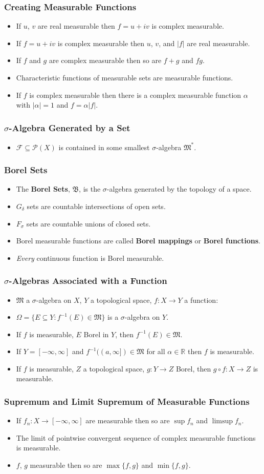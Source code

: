 \documentclass{article}
\newcounter{topicnumber}[section]
\newcommand{\steptopic}[1][1]{\addtocounter{topicnumber}{#1}}
\newenvironment{topic}[1]{%
\steptopic%
\subsubsection{#1}%
\begin{itemize}%
}{%
\end{itemize}%
}
\newcommand{\term}[1]{{\bf #1}}
\newcommand{\setup}{\item[\null]}
\newcommand{\remark}{\item}
\newcommand{\powerset}{\mathscr{P}}
\begin{document}
\begin{topic}{Creating Measurable Functions}
\remark If $u$, $v$ are real measurable then $f = u + iv$ is complex measurable.
\remark If $f = u + iv$ is complex measurable then $u$, $v$, and $|f|$ are real measurable.
\remark If $f$ and $g$ are complex measurable then so are $f + g$ and $fg$.
\remark Characteristic functions of measurable sets are measurable functions.
\remark If $f$ is complex measurable then there is a complex measurable function $\alpha$ with $|\alpha| = 1$ and $f = \alpha |f|$.
\end{topic}

\begin{topic}{$\sigma$-Algebra Generated by a Set}
\remark $\mathscr{F} \subseteq \powerset(X)$ is contained in some smallest $\sigma$-algebra $\mathfrak{M}^*$.
\end{topic}

\begin{topic}{Borel Sets}
\remark The \term{Borel Sets}, $\mathfrak{B}$, is the $\sigma$-algebra generated by the topology of a space.
\remark $G_\delta$ sets are countable intersections of open sets.
\remark $F_\sigma$ sets are countable unions of closed sets.
\remark Borel measurable functions are called \term{Borel mappings} or \term{Borel functions}.
\remark {\em Every} continuous function is Borel measurable.
\end{topic}

\begin{topic}{$\sigma$-Algebras Associated with a Function}
\setup $\mathfrak{M}$ a $\sigma$-algebra on $X$, $Y$ a topological space, $f : X \to Y$ a function:
\remark $\Omega = \{ E \subseteq Y : f^{-1}(E) \in \mathfrak{M} \}$ is a $\sigma$-algebra on $Y$.
\remark If $f$ is measurable, $E$ Borel in $Y$, then $f^{-1}(E) \in \mathfrak{M}$.
\remark If $Y = [-\infty, \infty]$ and $f^{-1}((a, \infty]) \in \mathfrak{M}$ for all $\alpha \in \mathbb{R}$ then $f$ is measurable.
\remark If $f$ is measurable, $Z$ a topological space, $g : Y \to Z$ Borel, then $g \circ f : X \to Z$ is measurable.
\end{topic}

\steptopic

\begin{topic}{Supremum and Limit Supremum of Measurable Functions}
\remark If $f_n : X \to [-\infty, \infty]$ are measurable then so are $\sup f_n$ and $\limsup f_n.$
\remark The limit of pointwise convergent sequence of complex measurable functions is measurable.
\remark $f$, $g$ measurable then so are $\max\{f, g\}$ and $\min\{f,g\}$.
\end{topic}
\end{document}
